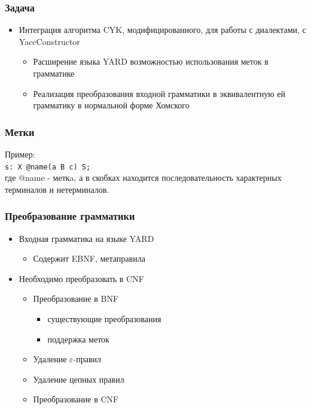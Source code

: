 \documentclass{beamer}
\begin{document}
\author[Ильнур Байгильдин]{}

\begin{frame}
	\transwipe[direction=90]
	\frametitle{Задача}
	\begin{itemize}
	    \item Интеграция алгоритма CYK, модифицированного, для работы с диалектами, с YaccConstructor
    	\begin{itemize}
            \item Расширение языка YARD возможностью использования меток в грамматике
            \item Реализация преобразования входной грамматики в эквивалентную ей грамматику в нормальной форме Хомского
        \end{itemize}
    \end{itemize}
\end{frame}

\begin{frame}[fragile]
	\transwipe[direction=90]
	\frametitle{Метки}
	Пример:
	\\
	\verb|s: X @name(a B c) S;|
	\\
	где @name - меткa, а в скобках находится последовательность характерных терминалов и нетерминалов.
\end{frame}

\begin{frame}
	\transwipe[direction=90]
	\frametitle{Преобразование грамматики}
	\begin{itemize}
	    \item Входная грамматика на языке YARD
	    \begin{itemize}
	        \item Содержит EBNF, метаправила
        \end{itemize}
        \item Необходимо преобразовать в CNF
        \begin{itemize}
            \item Преобразование в BNF
            \begin{itemize}
                \item существующие преобразования
                \item поддержка меток
            \end{itemize}
            \item Удаление $\varepsilon$-правил
            \item Удаление цепных правил
            \item Преобразование в CNF
        \end{itemize}
    \end{itemize}
\end{frame}    
\end{document}

